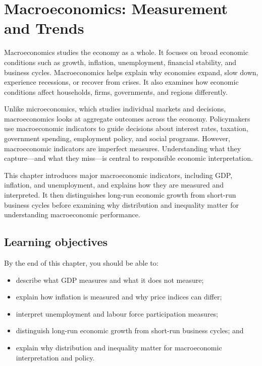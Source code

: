 \documentclass[
  11pt,
  oneside]{book}
\providecommand{\tightlist}{%
  \setlength{\itemsep}{0pt}\setlength{\parskip}{0pt}}
\begin{document}
\chapter{Macroeconomics: Measurement and Trends}\label{macro}

Macroeconomics studies the economy as a whole. It focuses on broad economic conditions such as growth, inflation, unemployment, financial stability, and business cycles. Macroeconomics helps explain why economies expand, slow down, experience recessions, or recover from crises. It also examines how economic conditions affect households, firms, governments, and regions differently.

Unlike microeconomics, which studies individual markets and decisions, macroeconomics looks at aggregate outcomes across the economy. Policymakers use macroeconomic indicators to guide decisions about interest rates, taxation, government spending, employment policy, and social programs. However, macroeconomic indicators are imperfect measures. Understanding what they capture---and what they miss---is central to responsible economic interpretation.

This chapter introduces major macroeconomic indicators, including GDP, inflation, and unemployment, and explains how they are measured and interpreted. It then distinguishes long-run economic growth from short-run business cycles before examining why distribution and inequality matter for understanding macroeconomic performance.

\section{Learning objectives}\label{learning-objectives-2}

By the end of this chapter, you should be able to:

\begin{itemize}
\tightlist
\item
  describe what GDP measures and what it does not measure;
\item
  explain how inflation is measured and why price indices can differ;
\item
  interpret unemployment and labour force participation measures;
\item
  distinguish long-run economic growth from short-run business cycles; and
\item
  explain why distribution and inequality matter for macroeconomic interpretation and policy.
\end{itemize}
\end{document}

